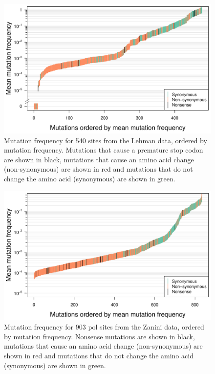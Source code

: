 \documentclass{article}
\begin{document}
\begin{figure}[ht!]
\centering
\includegraphics[scale = .7]{F1-ordered-Lehman-cex15.pdf}
\caption{Mutation frequency for 540 sites from the Lehman data, ordered by mutation frequency. Mutations that cause a premature stop codon are shown in black, mutations that cause an amino acid change (non-synonymous) are shown in red and mutations that do not change the amino acid (synonymous) are shown in green.}
\label{orderedLehman}
\end{figure}

\begin{figure}[ht!]
\centering
\includegraphics[scale = .7]{F1-ordered-Zanini-cex15.pdf}
\caption{Mutation frequency for 903 pol sites from the Zanini data, ordered by mutation frequency. Nonsense mutations are shown in black, mutations that cause an amino acid change (non-synonymous) are shown in red and mutations that do not change the amino acid (synonymous) are shown in green.}
\label{orderedZanini}
\end{figure}
\end{document}

